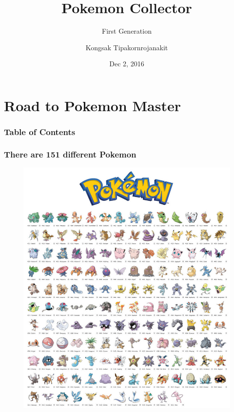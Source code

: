 \documentclass{beamer}
\title{Pokemon Collector}
\subtitle{First Generation}
\author{Kongsak Tipakornrojanakit}
\institute{Mahidol University, International College}
\date{Dec 2, 2016}
\theoremstyle{plain}
\begin{document}
	
	\begin{frame}
		\titlepage
	\end{frame}
	
	\section{Road to Pokemon Master}
	\begin{frame}
		\frametitle{Table of Contents}
		\tableofcontents[currentsection]
	\end{frame}
	
	\begin{frame}
		\frametitle{There are 151 different Pokemon}
		
		\begin{figure}
			\includegraphics[scale=.8]{Gen1List.jpg}
		\end{figure}
	\end{frame}
	
	
\end{document}
